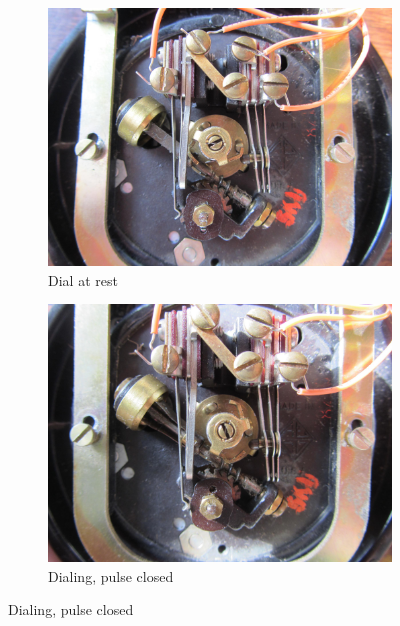 \documentclass{es50report}
\begin{document}
    \begin{figure}
        \centering
        \begin{subfigure}[b]{0.47\textwidth}
                \includegraphics[width=\textwidth, clip=true, trim=300 250 300 70]{images/small/dialRest}
                \caption{Dial at rest}
                \label{fig:dialRest}
        \end{subfigure}
        \begin{subfigure}[b]{0.47\textwidth}
                \includegraphics[width=\textwidth, clip=true, trim=300 250 300 70]{images/small/dialIsDialing}
                \caption{Dialing, pulse closed}
                \label{fig:dialIsDialing}
        \end{subfigure}


\end{figure}
\end{document}
